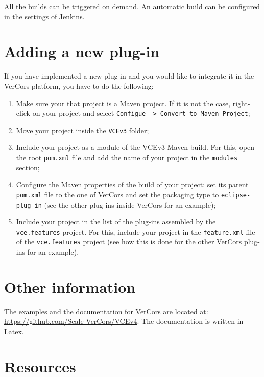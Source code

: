 \documentclass[12pt]{article}
\begin{document}
All the builds can be triggered on demand. An automatic build can be configured in the settings of Jenkins.

\section{Adding a new plug-in}

If you have implemented a new plug-in and you would like to integrate it in the VerCors platform, you have to do the following:

\begin{enumerate}
\item
Make sure your that project is a Maven project. If it is not the case, right-click on your project and select \texttt{Configue -> Convert to Maven Project};
\item
Move your project inside the \texttt{VCEv3} folder;
\item
Include your project as a module of the VCEv3 Maven build. For this, open the root \texttt{pom.xml} file and add the name of your project in the \texttt{modules} section;
\item
Configure the Maven properties of the build of your project: set its parent \texttt{pom.xml} file to the one of VerCors and set the packaging type to \texttt{eclipse-plug-in} (see the other plug-ins inside VerCors for an example);
\item
Include your project in the list of the plug-ins assembled by the \texttt{vce.features} project. For this, include your project in the \texttt{feature.xml} file of the \texttt{vce.features} project (see how this is done for the other VerCors plug-ins for an example). 
\end{enumerate}

\section{Other information}

The examples and the documentation for VerCors are located at: \url{https://github.com/Scale-VerCors/VCEv4}. The documentation is written in Latex. 

\section{Resources}
\label{sec:refs}
\end{document}
